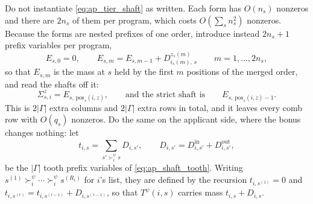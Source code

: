 \documentclass{article}
\begin{document}
Do not instantiate \eqref{eq:ap_tier_shaft} as written. Each form has $O(n_s)$ nonzeros and there are $2 n_s$ of them per program, which costs $O(\sum_s n_s^2)$ nonzeros. Because the forms are nested prefixes of one order, introduce instead $2 n_s + 1$ prefix variables per program,
\begin{equation}\label{eq:ap_prefix}
E_{s,0} = 0,
\qquad
E_{s,m} = E_{s,m-1} + D^{z_s(m)}_{i_s(m),\, s}
\qquad m = 1, \dots, 2 n_s,
\end{equation}
so that $E_{s,m}$ is the mass at $s$ held by the first $m$ positions of the merged order, and read the shafts off it:
\begin{equation}\label{eq:ap_shaft_prefix}
\Sigma^{z}_{s,i} = E_{s,\, \mathrm{pos}_s(i,z)},
\qquad\text{and the strict shaft is}\qquad
E_{s,\, \mathrm{pos}_s(i,z) - 1} .
\end{equation}
This is $2|\Gamma|$ extra columns and $2|\Gamma|$ extra rows in total, and it leaves every comb row with $O(q_s)$ nonzeros. Do the same on the applicant side, where the bonus changes nothing: let
\begin{equation}\label{eq:ap_tooth_prefix}
t_{i,s} = \sum_{s' \succ_i^\psi s} D_{i,s'},
\qquad D_{i,s'} = D^{\mathrm{in}}_{i,s'} + D^{\mathrm{out}}_{i,s'},
\end{equation}
be the $|\Gamma|$ tooth prefix variables of \eqref{eq:ap_shaft_tooth}. Writing $s^{(1)} \succ_i^\psi \cdots \succ_i^\psi s^{(R_i)}$ for $i$'s list, they are defined by the recursion $t_{i,s^{(1)}} = 0$ and $t_{i, s^{(r)}} = t_{i, s^{(r-1)}} + D_{i, s^{(r-1)}}$, so that $T^\psi(i,s)$ carries mass $t_{i,s} + D_{i,s}$.
\end{document}
